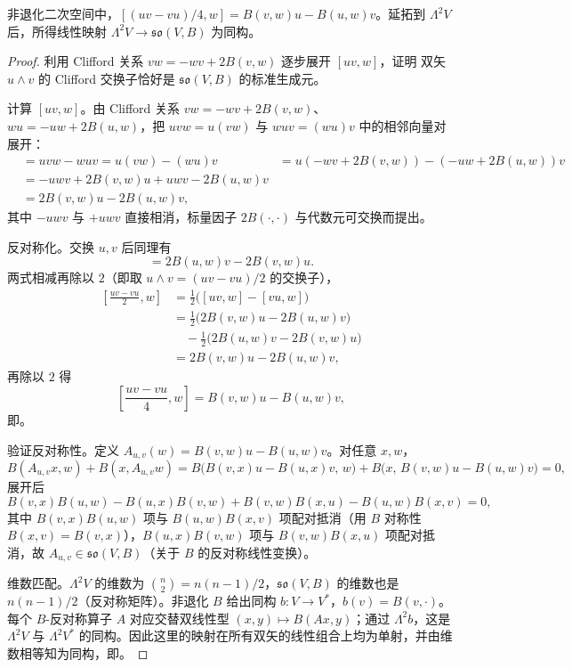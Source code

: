 \begin{proposition}
非退化二次空间中，$\left[(uv-vu)/4,w\right]=B(v,w)u-B(u,w)v$。延拓到 $\Lambda^2V$ 后，所得线性映射 $\Lambda^2V\to\mathfrak{so}(V,B)$ 为同构。
\end{proposition}
\begin{proof}
利用 Clifford 关系 $vw=-wv+2B(v,w)$ 逐步展开 $[uv,w]$，证明 双矢 $u\wedge v$ 的 Clifford 交换子恰好是 $\mathfrak{so}(V,B)$ 的标准生成元。

计算 $[uv,w]$。由 Clifford 关系 $vw=-wv+2B(v,w)$、$wu=-uw+2B(u,w)$，把 $uvw=u(vw)$ 与 $wuv=(wu)v$ 中的相邻向量对展开：
\begin{align*}
 [uv,w]
 &=uvw-wuv
 =u(vw)-(wu)v
 &=u(-wv+2B(v,w))-(-uw+2B(u,w))v\\
 &=-uwv+2B(v,w)u+uwv-2B(u,w)v\\
 &=2B(v,w)u-2B(u,w)v,
\end{align*}
其中 $-uwv$ 与 $+uwv$ 直接相消，标量因子 $2B(\cdot,\cdot)$ 与代数元可交换而提出。

反对称化。交换 $u,v$ 后同理有
\begin{equation*}
 [vu,w]
 =2B(u,w)v-2B(v,w)u.
\end{equation*}
两式相减再除以 $2$（即取 $u\wedge v=(uv-vu)/2$ 的交换子），
\begin{align*}
 \left[\frac{uv-vu}{2},w\right]
 &=\frac{1}{2}\bigl([uv,w]-[vu,w]\bigr)\\
 &=\frac{1}{2}\bigl(2B(v,w)u-2B(u,w)v\bigr)\\
 &\quad-\frac{1}{2}\bigl(2B(u,w)v-2B(v,w)u\bigr)\\
 &=2B(v,w)u-2B(u,w)v,
\end{align*}
再除以 $2$ 得
\begin{equation*}
 \left[\frac{uv-vu}{4},w\right]
 =B(v,w)u-B(u,w)v,
\end{equation*}
即。

验证反对称性。定义 $A_{u,v}(w)=B(v,w)u-B(u,w)v$。对任意 $x,w$，
\begin{equation*}
 B(A_{u,v}x,w)+B(x,A_{u,v}w)
 =B\bigl(B(v,x)u-B(u,x)v,\,w\bigr)+B\bigl(x,\,B(v,w)u-B(u,w)v\bigr)=0,
\end{equation*}
展开后
\[
B(v,x)B(u,w)-B(u,x)B(v,w)+B(v,w)B(x,u)-B(u,w)B(x,v)=0,
\]
其中 $B(v,x)B(u,w)$ 项与 $B(u,w)B(x,v)$ 项配对抵消（用 $B$ 对称性 $B(x,v)=B(v,x)$），$B(u,x)B(v,w)$ 项与 $B(v,w)B(x,u)$ 项配对抵消，故 $A_{u,v}\in\mathfrak{so}(V,B)$（关于 $B$ 的反对称线性变换）。

维数匹配。$\Lambda^2V$ 的维数为 $\binom{n}{2}=n(n-1)/2$，$\mathfrak{so}(V,B)$ 的维数也是 $n(n-1)/2$（反对称矩阵）。非退化 $B$ 给出同构 $b:V\to V^*$，$b(v)=B(v,\cdot)$。每个 $B$-反对称算子 $A$ 对应交替双线性型 $(x,y)\mapsto B(Ax,y)$；通过 $\Lambda^2b$，这是 $\Lambda^2V$ 与 $\Lambda^2V^*$ 的同构。因此这里的映射在所有双矢的线性组合上均为单射，并由维数相等知为同构，即。
\end{proof}

